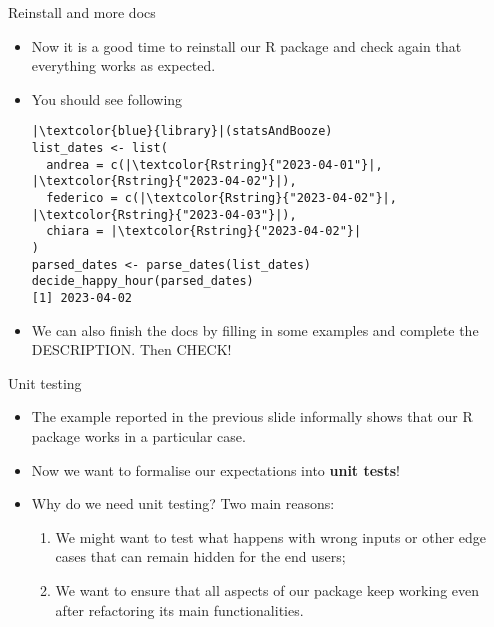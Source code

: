 \documentclass[
hyperref={bookmarks=false},
xcolor={dvipsnames,svgnames*,x11names*}, 
12pt
]{beamer}
\begin{document}
\begin{frame}[fragile]{Reinstall and more docs}
\vspace{-0.5cm}
\begin{itemize}
\itemsep 2ex
\item Now it is a good time to reinstall our R package and check again that everything works as expected. 
\item You should see following
\begin{lstlisting}
|\textcolor{blue}{library}|(statsAndBooze)
list_dates <- list(
  andrea = c(|\textcolor{Rstring}{"2023-04-01"}|, |\textcolor{Rstring}{"2023-04-02"}|), 
  federico = c(|\textcolor{Rstring}{"2023-04-02"}|, |\textcolor{Rstring}{"2023-04-03"}|), 
  chiara = |\textcolor{Rstring}{"2023-04-02"}|
)
parsed_dates <- parse_dates(list_dates)
decide_happy_hour(parsed_dates)
[1] 2023-04-02
\end{lstlisting}
\item We can also finish the docs by filling in some examples and complete the DESCRIPTION. Then CHECK!
\end{itemize}
\end{frame}

\begin{frame}[fragile]{Unit testing}
\vspace{-0.5cm}
\begin{itemize}
\itemsep 2ex
\item The example reported in the previous slide informally shows that our R package works in a particular case. 
\item Now we want to formalise our expectations into \textbf{unit tests}!
\item Why do we need unit testing? Two main reasons: 
\begin{enumerate}
\itemsep 1ex
\item We might want to test what happens with wrong inputs or other edge cases that can remain hidden for the end users;
\item We want to ensure that all aspects of our package keep working even after refactoring its main functionalities. 
\end{enumerate}
\end{itemize}
\end{frame}
\end{document}
